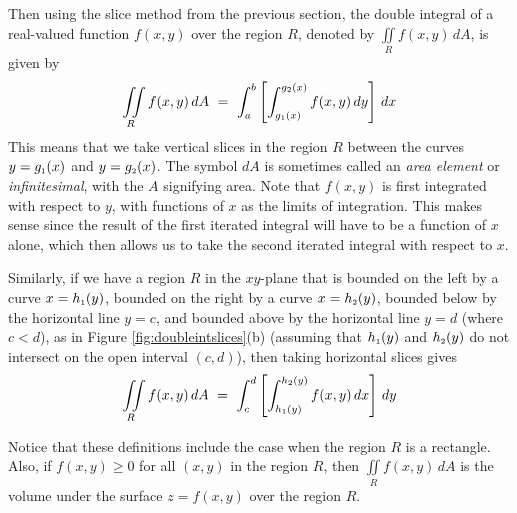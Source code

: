 Then using the slice method from the previous section, the double integral of a real-valued function $f(x,y)$
over the region $R$, denoted by $\displaystyle\iint\limits_{R} f(x,y)\,dA$, is given by\index{$\iint$}
\begin{equation}\label{eqn:doubleintvert}
 \iint\limits_{R} f(x,y)\,dA ~=~ \int_a^b \left[ \int_{g_{\scriptscriptstyle 1}(x)}^{g_{\scriptscriptstyle 2}(x)} f(x,y)\,dy \right] \,dx
\end{equation}
This means that we take vertical slices in the region $R$ between the curves $y=g_{\scriptscriptstyle 1}(x)$ and $y=g_{\scriptscriptstyle 2}(x)$.
The symbol $dA$ is sometimes called an \emph{area element} or \emph{infinitesimal}, with the $A$ signifying area.
Note that $f(x,y)$ is first integrated with respect to $y$, with functions of $x$ as the limits of
integration. This makes sense since the result of the first iterated integral will have to be a function of $x$
alone, which then allows us to take the second iterated integral with respect to $x$.

Similarly, if we have a region $R$ in the $xy$-plane that is bounded on the left by a curve $x=h_{\scriptscriptstyle 1}(y)$,
bounded on the right by a curve $x=h_{\scriptscriptstyle 2}(y)$, bounded below by the horizontal line $y=c$, and bounded above by
the horizontal line $y=d$ (where $c < d$), as in Figure \ref{fig:doubleintslices}(b) (assuming that
$h_{\scriptscriptstyle 1}(y)$ and $h_{\scriptscriptstyle 2}(y)$ do not intersect on the open interval $(c,d)$), then taking horizontal slices
gives
\begin{equation}\label{eqn:doubleinthoriz}
 \iint\limits_{R} f(x,y)\,dA ~=~ \int_c^d \left[ \int_{h_{\scriptscriptstyle 1}(y)}^{h_{\scriptscriptstyle 2}(y)} f(x,y)\,dx \right] \,dy
\end{equation}

Notice that these definitions
include the case when the region $R$ is a rectangle. Also, if $f(x,y) \ge 0$ for all $(x,y)$ in the region $R$,
then $\iint\limits_{R} f(x,y)\,dA$ is the volume under the surface $z=f(x,y)$ over the region $R$.

